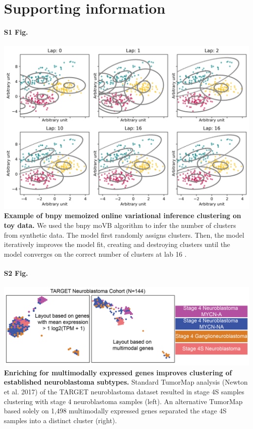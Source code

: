 \documentclass[10pt,letterpaper]{article}
\begin{document}
\section*{Supporting information}

\paragraph*{S1 Fig.}
\includegraphics[width=\textwidth]{img/PNG/cluster-over-time}
\label{S1_Fig}
{\bf Example of bnpy memoized online variational inference clustering on toy data.} We used the bnpy moVB algorithm to infer the number of clusters from synthetic data. The model first randomly assigns clusters. Then, the model iteratively improves the model fit, creating and destroying clusters until the model converges on the correct number of clusters at lab 16 \cite{hughesBnpyReliableScalable}.

\paragraph*{S2 Fig.}
\includegraphics[width=\textwidth]{img/PNG/TumorMap-NBL-MM-V2-2x}
\label{S2_Fig}
{\bf Enriching for multimodally expressed genes improves clustering of established neuroblastoma subtypes.} Standard TumorMap analysis (Newton et al. 2017) of the TARGET neuroblastoma dataset resulted in stage 4S samples clustering with stage 4 neuroblastoma samples (left). An alternative TumorMap based solely on 1,498 multimodally expressed genes separated the stage 4S samples into a distinct cluster (right).
\end{document}
